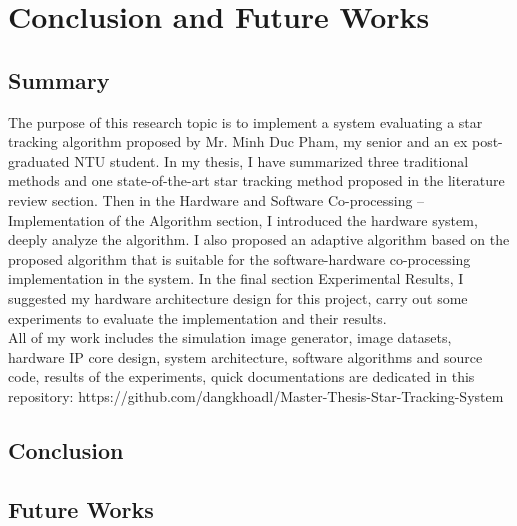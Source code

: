\chapter{Conclusion and Future Works}
\label{chap:conclusion}

\section{Summary}

The purpose of this research topic is to implement a system evaluating a star tracking algorithm proposed by Mr. Minh Duc Pham\cite{MDP,edselc.2-52.0-8487677997120120101,edseee.655799920130101}, my senior and an ex post-graduated NTU student. In my thesis, I have summarized three traditional methods and one state-of-the-art star tracking method proposed in the literature review section. Then in the Hardware and Software Co-processing – Implementation of the Algorithm section, I introduced the hardware system, deeply analyze the algorithm. I also proposed an adaptive algorithm based on the proposed algorithm that is suitable for the software-hardware co-processing implementation in the system. In the final section Experimental Results, I suggested my hardware architecture design for this project, carry out some experiments to evaluate the implementation and their results. \\

\noindent All of my work includes the simulation image generator, image datasets, hardware IP core design, system architecture, software algorithms and source code, results of the experiments, quick documentations are dedicated in this repository: https://github.com/dangkhoadl/Master-Thesis-Star-Tracking-System

\section{Conclusion}

\section{Future Works}



